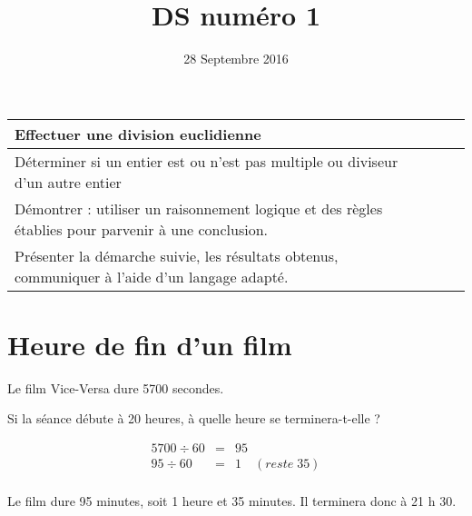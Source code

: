 \documentclass[a4paper,11pt]{exam}
\date{28 Septembre 2016}
\title{DS num\'ero 1}
\makeatletter
\def\maketitle{%
	\par\centering\Huge\textbf{\@title}%
	\par}
\makeatother
\begin{document}
	
	\maketitle
\begin{small}
\begin{center}
	\begin{tabular}{|@{\ }l@{}|@{\ }c@{\ }|}
		\hline
		Effectuer une division euclidienne &  \\
		\hline
		Déterminer si un entier est ou n'est pas multiple ou diviseur d'un autre entier &  $\qquad$\\
		\hline
		Démontrer : utiliser un raisonnement logique et des règles établies pour parvenir à une conclusion. &  \\
		\hline
		Présenter la démarche suivie, les résultats obtenus, communiquer à l’aide d’un langage adapté. &  \\
		\hline
	\end{tabular}
\end{center}
\end{small}	
	

\section{Heure de fin d'un film}

Le film Vice-Versa dure \num{5700} secondes. 


\begin{questions}
	\question Si la séance débute à 20 heures, à quelle heure se terminera-t-elle ?
	
	\begin{solution}
		\begin{eqnarray*}
			5700 \div 60 &=& 95  \\
			95 \div 60 &=& 1 \quad (reste\; 35)\\
		\end{eqnarray*}
		
		Le film dure 95 minutes, soit 1 heure et 35 minutes. Il terminera donc à 21 h 30.
	\end{solution}
\end{questions}
	
\end{document}

